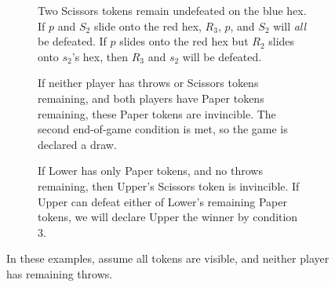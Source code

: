 \documentclass[]{article}
\newcommand{\hex}[4] {
    \node[hex,fill={#3}] at ({#1}, {#2}) {};
    \node[hex,thick,draw={#3},fill={#3!10}] at ({#1}, {#2}) {};
    \node at ({#1}, {#2}) {{#4}};
}
\newcommand{\uptoken}[3] {
    \node[draw,circle,minimum size=6.8mm,fill=white] at (#1, #2) {};
    \node[draw,circle,minimum size=5.2mm,very thick,black]  at (#1, #2) {};
    \node[] at (#1, #2) {#3};
}
\newcommand{\lotoken}[3] {
    \node[draw,circle,minimum size=6.8mm,fill=white] at (#1, #2) {};
    \node[draw,circle,minimum size=5.2mm,very thick,purple] at (#1, #2) {};
    \node[] at (#1, #2) {#3};
}
\newcommand{\board} {
    \tikzset{
        hex/.style={
            regular polygon,
            regular polygon sides=6,
            minimum size=10mm,
            inner sep=0mm,
            outer sep=0mm,
            rotate=30,
            draw
        },
        x={(4.33mm,7.5mm)},
        y={(8.66mm,0mm)}
    }
    \foreach \r/\q in {
                    +4/-4,+4/-3,+4/-2,+4/-1,+4/+0,
                 +3/-4,+3/-3,+3/-2,+3/-1,+3/+0,+3/+1,
              +2/-4,+2/-3,+2/-2,+2/-1,+2/+0,+2/+1,+2/+2,
           +1/-4,+1/-3,+1/-2,+1/-1,+1/+0,+1/+1,+1/+2,+1/+3,
        +0/-4,+0/-3,+0/-2,+0/-1,+0/+0,+0/+1,+0/+2,+0/+3,+0/+4,
           -1/-3,-1/-2,-1/-1,-1/+0,-1/+1,-1/+2,-1/+3,-1/+4,
              -2/-2,-2/-1,-2/+0,-2/+1,-2/+2,-2/+3,-2/+4,
                 -3/-1,-3/+0,-3/+1,-3/+2,-3/+3,-3/+4,
                    -4/+0,-4/+1,-4/+2,-4/+3,-4/+4,
    }
        \node[hex,fill=black!5] at (\r, \q) {};
}
\begin{document}
\begin{figure}[ht!]
\centering
\begin{subfigure}{.32\textwidth}
    \centering
    \caption{
        \label{fig:battles}
        Two Scissors tokens remain undefeated on the {\color{blue}blue}
        hex.
        If $p$ and $S_2$ slide onto the {\color{red}red} hex, $R_3$, $p$,
        and $S_2$ will \textit{all} be defeated.
        If $p$ slides onto the {\color{red}red} hex but $R_2$ slides onto
        $s_2$'s hex, then $R_3$ and $s_2$ will be defeated.
    }
\end{subfigure}
\begin{subfigure}{.01\textwidth}\end{subfigure}
\begin{subfigure}{.32\textwidth}
    \centering
    \caption{\label{fig:draw}
        If neither player has throws or Scissors tokens remaining,
        and both players have Paper tokens remaining, these
        Paper tokens are invincible.
        The second end-of-game condition is met, so the game is declared
        a draw.
    }
\end{subfigure}
\begin{subfigure}{.01\textwidth}\end{subfigure}
\begin{subfigure}{.32\textwidth}
    \centering
    \caption{\label{fig:winner}
        If Lower has only Paper tokens, and no throws remaining, then Upper's
        Scissors token is invincible.
        If Upper can defeat either of Lower's remaining Paper tokens, we will
        declare Upper the winner by condition 3.
    }
\end{subfigure}
\caption{
    In these examples, assume all tokens are visible, and neither
    player has remaining throws.
}
\end{figure}
\end{document}
